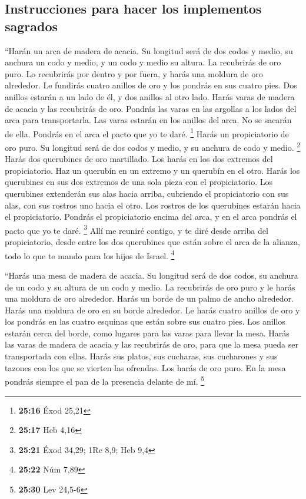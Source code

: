 \begin{paracol}{2}
\hypertarget{instrucciones-para-hacer-los-implementos-sagrados}{%
\subsection{Instrucciones para hacer los implementos
sagrados}\label{instrucciones-para-hacer-los-implementos-sagrados}}

 ``Harán un arca de madera de acacia. Su longitud será de
dos codos y medio, su anchura un codo y medio, y un codo y medio su
altura.  La recubrirás de oro puro. Lo recubrirás por
dentro y por fuera, y harás una moldura de oro alrededor.
 Le fundirás cuatro anillos de oro y los pondrás en sus
cuatro pies. Dos anillos estarán a un lado de él, y dos anillos al otro
lado.  Harás varas de madera de acacia y las recubrirás
de oro.  Pondrás las varas en las argollas a los lados
del arca para transportarla.  Las varas estarán en los
anillos del arca. No se sacarán de ella.  Pondrás en el
arca el pacto que yo te daré. \footnote{\textbf{25:16} Éxod 25,21}
 Harás un propiciatorio de oro puro. Su longitud será de
dos codos y medio, y su anchura de codo y medio. \footnote{\textbf{25:17}
  Heb 4,16}  Harás dos querubines de oro martillado. Los
harás en los dos extremos del propiciatorio.  Haz un
querubín en un extremo y un querubín en el otro. Harás los querubines en
sus dos extremos de una sola pieza con el propiciatorio. 
Los querubines extenderán sus alas hacia arriba, cubriendo el
propiciatorio con sus alas, con sus rostros uno hacia el otro. Los
rostros de los querubines estarán hacia el propiciatorio.
 Pondrás el propiciatorio encima del arca, y en el arca
pondrás el pacto que yo te daré. \footnote{\textbf{25:21} Éxod 34,29;
  1Re 8,9; Heb 9,4}  Allí me reuniré contigo, y te diré
desde arriba del propiciatorio, desde entre los dos querubines que están
sobre el arca de la alianza, todo lo que te mando para los hijos de
Israel. \footnote{\textbf{25:22} Núm 7,89}

 ``Harás una mesa de madera de acacia. Su longitud será
de dos codos, su anchura de un codo y su altura de un codo y medio.
 La recubrirás de oro puro y le harás una moldura de oro
alrededor.  Harás un borde de un palmo de ancho
alrededor. Harás una moldura de oro en su borde alrededor.
 Le harás cuatro anillos de oro y los pondrás en las
cuatro esquinas que están sobre sus cuatro pies.  Los
anillos estarán cerca del borde, como lugares para las varas para llevar
la mesa.  Harás las varas de madera de acacia y las
recubrirás de oro, para que la mesa pueda ser transportada con ellas.
 Harás sus platos, sus cucharas, sus cucharones y sus
tazones con los que se vierten las ofrendas. Los harás de oro puro.
 En la mesa pondrás siempre el pan de la presencia
delante de mí. \footnote{\textbf{25:30} Lev 24,5-6}


\end{paracol}
